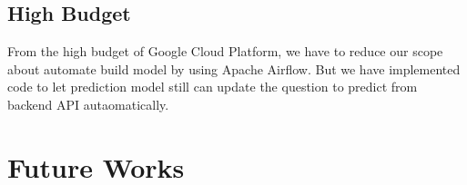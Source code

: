 \documentclass[12pt,oneside,openright,a4paper]{cpe-english-project}
\begin{document}
\subsection{High Budget}
From the high budget of Google Cloud Platform, we have to reduce our scope about automate build model
by using Apache Airflow. But we have implemented code to let prediction model still can update the
question to predict from backend API autaomatically.

\section{Future Works}
\subsubsection{}
\subsubsection{}
\subsubsection{}
\subsubsection{}


\nocite{*}




\end{document}
